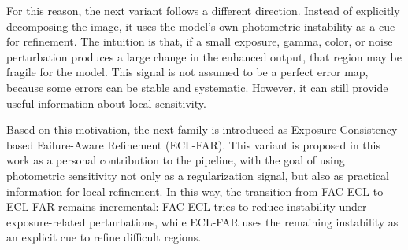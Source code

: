 For this reason, the next variant follows a different direction. Instead of explicitly decomposing the image, it uses the model's own photometric instability as a cue for refinement. The intuition is that, if a small exposure, gamma, color, or noise perturbation produces a large change in the enhanced output, that region may be fragile for the model. This signal is not assumed to be a perfect error map, because some errors can be stable and systematic. However, it can still provide useful information about local sensitivity.

Based on this motivation, the next family is introduced as Exposure-Consistency-based Failure-Aware Refinement (ECL-FAR). This variant is proposed in this work as a personal contribution to the pipeline, with the goal of using photometric sensitivity not only as a regularization signal, but also as practical information for local refinement. In this way, the transition from FAC-ECL to ECL-FAR remains incremental: FAC-ECL tries to reduce instability under exposure-related perturbations, while ECL-FAR uses the remaining instability as an explicit cue to refine difficult regions.